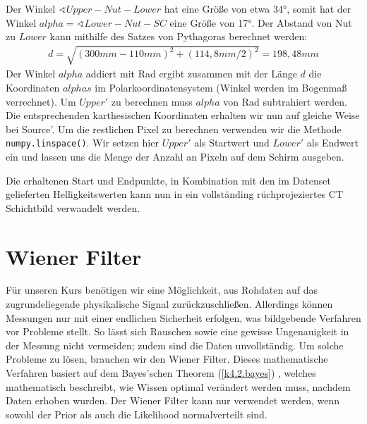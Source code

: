 \documentclass[]{dsadokumentation}
\begin{document}
Der Winkel $\sphericalangle Upper-Nut-Lower$ hat eine Größe von etwa 34°, somit hat der Winkel $alpha = \sphericalangle Lower-Nut-SC$ eine Größe von 17°. Der Abstand von Nut zu $Lower$ kann mithilfe des Satzes von Pythagoras berechnet werden:
\begin{align}
d = \sqrt{(300mm - 110mm)^2+(114,8mm/2)^2} = 198,48mm
\end{align}
Der Winkel $alpha$ addiert mit Rad ergibt zusammen mit der Länge $d$ die Koordinaten $alphas$ im Polarkoordinatensystem (Winkel werden im Bogenmaß verrechnet). Um $Upper'$ zu berechnen muss $alpha$ von Rad subtrahiert werden. Die entsprechenden karthesischen Koordinaten erhalten wir nun auf gleiche Weise bei Source'. Um die restlichen Pixel zu berechnen verwenden wir die Methode \verb+numpy.linspace()+. Wir setzen hier $Upper'$ als Startwert und $Lower'$ als Endwert ein und lassen uns die Menge der Anzahl an Pixeln auf dem Schirm ausgeben. 

Die erhaltenen Start und Endpunkte, in Kombination mit den im Datenset gelieferten Helligkeitswerten kann nun in ein vollständing rüchprojeziertes CT Schichtbild verwandelt werden.


\section{Wiener Filter}\label{k4.2.wiener.filter}

Für unseren Kurs benötigen wir eine Möglichkeit, aus Rohdaten auf das zugrundeliegende physikalische Signal zurückzuschließen. Allerdings können Messungen nur mit einer endlichen Sicherheit erfolgen, was bildgebende Verfahren vor Probleme stellt. So lässt sich Rauschen sowie eine gewisse Ungenauigkeit in der Messung nicht vermeiden; zudem sind die Daten unvollständig. Um solche Probleme zu lösen, brauchen wir den Wiener Filter.
Dieses mathematische Verfahren basiert auf dem Bayes'schen Theorem
(\ref{k4.2.bayes})
, welches mathematisch beschreibt, wie Wissen optimal verändert werden muss, nachdem Daten erhoben wurden. Der Wiener Filter kann nur verwendet werden, wenn sowohl der Prior als auch die Likelihood normalverteilt sind.
\end{document}
